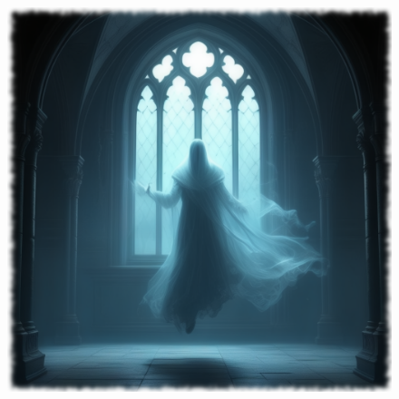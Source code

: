 \begin{figure}[h]
\begin{center}
\includegraphics[scale=0.24]{img/ai-images/ghost.png}
\end{center}
\end{figure}
